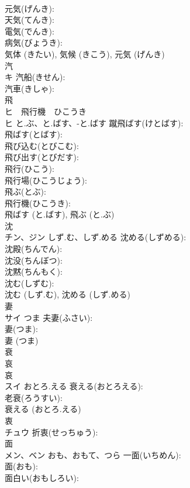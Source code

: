 \documentclass[8pt]{extreport}
\begin{document}
\begin{CJK}{UTF8}{min}
\\	元気(げんき): 
\\	天気(てんき): 
\\	電気(でんき): 
\\	病気(びょうき): 
\\	気体 (きたい), 気候 (きこう), 元気 (げんき)
\\	汽			
\\	キ		汽船(きせん): 
\\	汽車(きしゃ): 
\\	飛			
\\	ヒ　飛行機　ひこうき
\\	ヒ	と.ぶ、と.ばす、-と.ばす	蹴飛ばす(けとばす): 
\\	飛ばす(とばす): 
\\	飛び込む(とびこむ): 
\\	飛び出す(とびだす): 
\\	飛行(ひこう): 
\\	飛行場(ひこうじょう): 
\\	飛ぶ(とぶ): 
\\	飛行機(ひこうき): 
\\	飛ばす (と.ばす), 飛ぶ (と.ぶ)
\\	沈			
\\	チン、ジン	しず.む、しず.める	沈める(しずめる): 
\\	沈殿(ちんでん): 
\\	沈没(ちんぼつ): 
\\	沈黙(ちんもく): 
\\	沈む(しずむ): 
\\	沈む (しず.む), 沈める (しず.める)
\\	妻			
\\	サイ	つま	夫妻(ふさい): 
\\	妻(つま): 
\\	妻 (つま)
\\	衰			
\\	哀 
\\	哀 
\\	スイ	おとろ.える	衰える(おとろえる): 
\\	老衰(ろうすい): 
\\	衰える (おとろ.える)
\\	衷			
\\	チュウ		折衷(せっちゅう): 
\\	面			
\\	メン、ベン	おも、おもて、つら	一面(いちめん): 
\\	面(おも): 
\\	面白い(おもしろい): 

\end{CJK}
\end{document}
